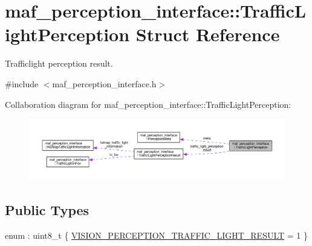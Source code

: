 \hypertarget{structmaf__perception__interface_1_1TrafficLightPerception}{}\section{maf\+\_\+perception\+\_\+interface\+:\+:Traffic\+Light\+Perception Struct Reference}
\label{structmaf__perception__interface_1_1TrafficLightPerception}


Trafficlight perception result.  




{\ttfamily \#include $<$maf\+\_\+perception\+\_\+interface.\+h$>$}



Collaboration diagram for maf\+\_\+perception\+\_\+interface\+:\+:Traffic\+Light\+Perception\+:\nopagebreak
\begin{figure}[H]
\begin{center}
\leavevmode
\includegraphics[width=350pt]{structmaf__perception__interface_1_1TrafficLightPerception__coll__graph}
\end{center}
\end{figure}
\subsection*{Public Types}
\begin{DoxyCompactItemize}
\item 
enum \+: uint8\+\_\+t \{ \hyperlink{structmaf__perception__interface_1_1TrafficLightPerception_a77b8efdac5d604c1500085e74762050ca094e21a09404dd61c576db60c1d52949}{V\+I\+S\+I\+O\+N\+\_\+\+P\+E\+R\+C\+E\+P\+T\+I\+O\+N\+\_\+\+T\+R\+A\+F\+F\+I\+C\+\_\+\+L\+I\+G\+H\+T\+\_\+\+R\+E\+S\+U\+LT} = 1
 \}
\end{DoxyCompactItemize}
